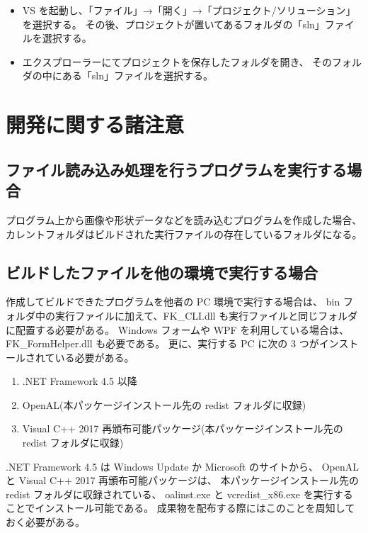\documentclass[a4paper]{jsarticle}
\begin{document}
\begin{itemize}
 \item VS を起動し、「ファイル」→「開く」→「プロジェクト/ソリューション」を選択する。
	その後、プロジェクトが置いてあるフォルダの「sln」ファイルを選択する。

 \item エクスプローラーにてプロジェクトを保存したフォルダを開き、
	そのフォルダの中にある「sln」ファイルを選択する。
\end{itemize}

\section{開発に関する諸注意}
\subsection{ファイル読み込み処理を行うプログラムを実行する場合}
プログラム上から画像や形状データなどを読み込むプログラムを作成した場合、
カレントフォルダはビルドされた実行ファイルの存在しているフォルダになる。

\subsection{ビルドしたファイルを他の環境で実行する場合}
作成してビルドできたプログラムを他者の PC 環境で実行する場合は、
bin フォルダ中の実行ファイルに加えて、FK\_CLI.dll も実行ファイルと同じフォルダに配置する必要がある。
Windows フォームや WPF を利用している場合は、FK\_FormHelper.dll も必要である。
更に、実行する PC に次の 3 つがインストールされている必要がある。

\begin{enumerate}
\item .NET Framework 4.5 以降
\item OpenAL(本パッケージインストール先の redist フォルダに収録)
\item Visual C++ 2017 再頒布可能パッケージ(本パッケージインストール先の redist フォルダに収録)
\end{enumerate}

.NET Framework 4.5 は Windows Update か Microsoft のサイトから、
OpenAL と Visual C++ 2017 再頒布可能パッケージは、
本パッケージインストール先の redist フォルダに収録されている、
oalinst.exe と vcredist\_x86.exe を実行することでインストール可能である。
成果物を配布する際にはこのことを周知しておく必要がある。
\end{document}
